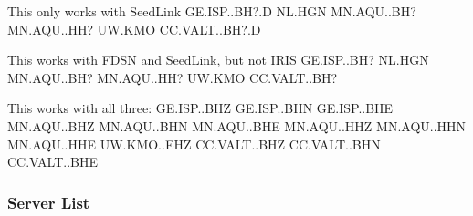 \documentclass[letterpaper,11pt,english]{sphinxmanual}
\begin{document}
\begin{sphinxVerbatim}[commandchars=\\\{\}]
\PYGZsh{} This only works with SeedLink
GE.ISP..BH?.D
NL.HGN
MN.AQU..BH?
MN.AQU..HH?
UW.KMO
CC.VALT..BH?.D

\PYGZsh{} This works with FDSN and SeedLink, but not IRIS
GE.ISP..BH?
NL.HGN
MN.AQU..BH?
MN.AQU..HH?
UW.KMO
CC.VALT..BH?

\PYGZsh{} This works with all three:
GE.ISP..BHZ
GE.ISP..BHN
GE.ISP..BHE
MN.AQU..BHZ
MN.AQU..BHN
MN.AQU..BHE
MN.AQU..HHZ
MN.AQU..HHN
MN.AQU..HHE
UW.KMO..EHZ
CC.VALT..BHZ
CC.VALT..BHN
CC.VALT..BHE
\end{sphinxVerbatim}


\subsubsection{Server List}
\end{document}

